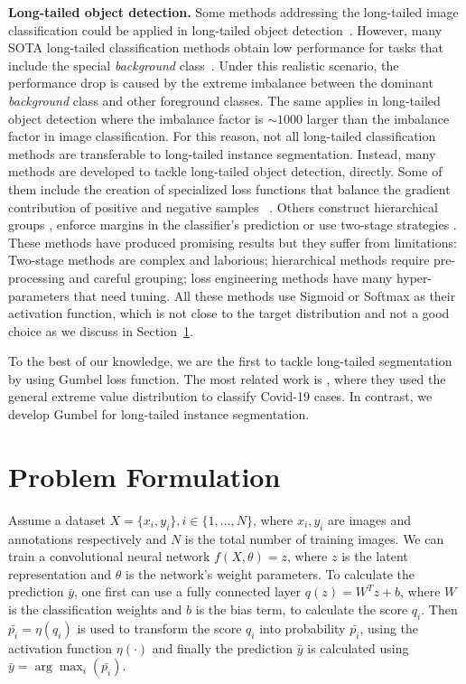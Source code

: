\documentclass[runningheads]{llncs}
\begin{document}
\noindent \textbf{Long-tailed  object detection.} Some methods addressing the long-tailed image classification could be applied in long-tailed  object detection~\cite{Ren2020balms,tan2020equalization,wang2021seesaw,kang2019decoupling}. However, many SOTA long-tailed classification methods obtain low performance for tasks that include the special \textit{background} class~\cite{mullapudi2021background}. Under this realistic scenario, the performance drop is caused by the extreme imbalance between the dominant \textit{background} class and other foreground classes. 
The same applies in long-tailed  object detection where the imbalance factor is $\sim 1000$ larger than the imbalance factor in image classification. For this reason, not all long-tailed  classification methods are transferable to long-tailed  instance segmentation. Instead, many methods are developed to tackle long-tailed  object detection, directly. Some of them include the creation of specialized loss functions that balance the gradient contribution of positive and negative samples ~\cite{tan2020equalization,tan2021equalization,wang2021adaptive,wang2021seesaw,peng2020large}. Others construct hierarchical groups \cite{li2020overcoming,wu2020forest}, enforce margins in the classifier's prediction \cite{feng2021exploring,Ren2020balms,tang2020long} or use two-stage strategies \cite{wang2020devil,kang2019decoupling,zhang2021distribution}. These methods have produced promising results but they suffer from limitations: Two-stage methods are complex and laborious; hierarchical methods require pre-processing and careful grouping; loss engineering methods have many hyper-parameters that need tuning. All these methods use Sigmoid or Softmax as their activation function, which is not close to the target distribution and not a good choice as we discuss in Section~\ref{sec:problem}. 

To the best of our knowledge, we are the first to tackle long-tailed segmentation by using Gumbel loss function.
The most related work is \cite{bridge2020introducing}, where they used the general extreme value distribution to classify Covid-19 cases. In contrast, we develop Gumbel for long-tailed instance segmentation. 

\section{Problem Formulation}
\label{sec:problem}

Assume a dataset $X = \{x_i,y_i\},i\in\{1,...,N\}$, where $x_i,y_i$ are images and annotations respectively and $N$ is the total number of training images. We can train a convolutional neural network $f(X,\theta)=z$, where $z$ is the latent representation and $\theta$ is the network's weight parameters. To calculate the prediction $\bar{y}$, one first can use a fully connected layer $q(z)=W^Tz +b$, where $W$ is the classification weights and $b$ is the bias term, to calculate the score $q_i$. Then $\bar{p_i}=\eta(q_i)$ is used to transform the score $q_i$ into probability $\bar{p_i}$, using the activation function $\eta(\cdot)$ and finally the prediction $\bar{y}$ is calculated using $\bar{y}=\arg \max_i(\bar{p_i})$.
\end{document}
